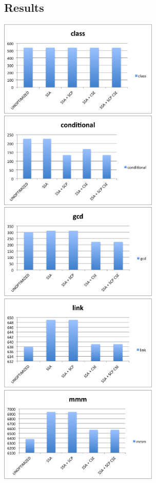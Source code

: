 \documentclass[12pt,letterpaper]{article}
\begin{document}
\subsection*{Results}


\begin{center}
\includegraphics[width=3in]{class.png}
\includegraphics[width=3in]{conditional.png}
\includegraphics[width=3in]{gcd.png}
\includegraphics[width=3in]{link.png}
\includegraphics[width=3in]{mmm.png}

\end{center}
\end{document}
